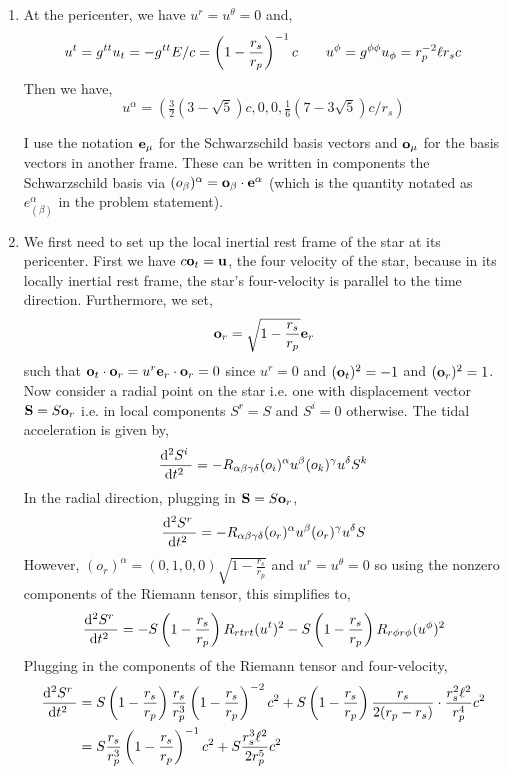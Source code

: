 \documentclass[12pt]{article}
\begin{document}
\begin{enumerate}
\item At the pericenter, we have $u^r = u^\theta = 0$ and,
\[ u^t = g^{tt} u_t = - g^{tt} E/c = \sh{r_p}^{-1} c  \quad \quad u^\phi = g^{\phi \phi} u_{\phi} = r_p^{-2} \ell r_s c \]
Then we have,
\[ u^\alpha = (\tfrac{3}{2}(3 - \sqrt{5}) c, 0, 0, \tfrac{1}{6}(7 - 3 \sqrt{5}) c/r_s) \]

\begin{remark}
I use the notation $\bf{e}_\mu$ for the Schwarzschild basis vectors and $\bf{o}_\mu$ for the basis vectors in another frame. These can be written in components the Schwarzschild basis via $(o_\beta)^\alpha = \bf{o}_\beta \cdot \bf{e}^\alpha$ (which is the quantity notated as $e_{(\beta)}^\alpha$ in the problem statement). 
\end{remark}

\item We first need to set up the local inertial rest frame of the star at its pericenter. First we have $c \bf{o}_t = \bf{u}$, the four velocity of the star, because in its locally inertial rest frame, the star's four-velocity is parallel to the time direction. Furthermore, we set,
\[ \bf{o}_r = \sqrt{1 - \frac{r_s}{r_p}} \bf{e}_r \]
such that $\bf{o}_t \cdot \bf{o}_r = u^r \bf{e}_r \cdot \bf{o}_r = 0$ since $u^r = 0$ and $(\bf{o}_t)^2 = -1$ and $(\bf{o}_r)^2 = 1$.
\bigskip\\
Now consider a radial point on the star i.e. one with displacement vector $\bf{S} = S \bf{o}_r$ i.e. in local components $S^r = S$ and $S^i = 0$ otherwise. The tidal acceleration is given by,
\[ \nderiv{2}{S^i}{t} = - R_{\alpha \beta \gamma \delta} (o_i)^\alpha u^\beta (o_k)^\gamma u^\delta S^k \]
In the radial direction, plugging in $\bf{S} = S \bf{o}_r$,
\[ \nderiv{2}{S^r}{t} = - R_{\alpha \beta \gamma \delta} (o_r)^\alpha u^\beta (o_r)^\gamma u^\delta S \]
However, $(o_r)^\alpha = (0,1,0,0) \sqrt{1 - \frac{r_s}{r_p}}$ and $u^r = u^\theta = 0$ so using the nonzero components of the Riemann tensor, this simplifies to,
\[ \nderiv{2}{S^r}{t} = - S \sh{r_p} R_{rtrt} (u^t)^2 - S \sh{r_p} R_{r\phi r \phi} (u^\phi)^2 \]
Plugging in the components of the Riemann tensor and four-velocity,
\begin{align*}
\nderiv{2}{S^r}{t} & = S \sh{r_p} \frac{r_s}{r_p^3} \sh{r_p}^{-2} c^2 + S \sh{r_p} 
\frac{r_s}{2(r_p - r_s)} \cdot \frac{r_s^2 \ell^2}{r_p^4} c^2
\\
& = S \frac{r_s}{r_p^3} \sh{r_p}^{-1} c^2 + S\frac{r_s^3 \ell^2}{2r_p^5} c^2
\end{align*}


\end{enumerate}
\end{document}
